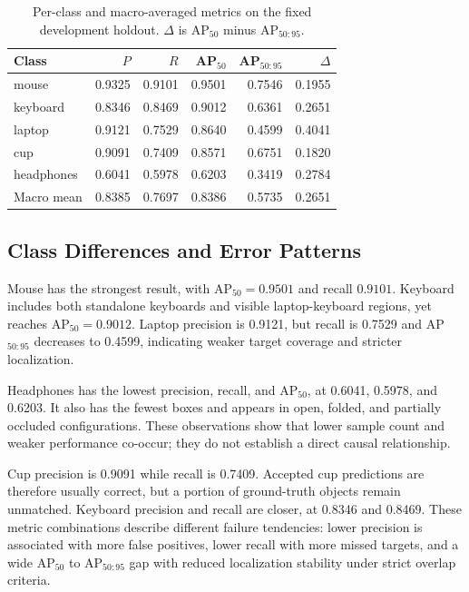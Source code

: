 \documentclass[12pt,a4paper]{article}
\begin{document}
\begin{table}[H]
\caption{Per-class and macro-averaged metrics on the fixed development holdout. $\Delta$ is AP$_{50}$ minus AP$_{50:95}$.}
\label{tab:metrics}
\centering
\small
\begin{tabular}{lrrrrr}
\toprule
Class & $P$ & $R$ & AP$_{50}$ & AP$_{50:95}$ & $\Delta$ \\
\midrule
mouse & 0.9325 & 0.9101 & 0.9501 & 0.7546 & 0.1955 \\
keyboard & 0.8346 & 0.8469 & 0.9012 & 0.6361 & 0.2651 \\
laptop & 0.9121 & 0.7529 & 0.8640 & 0.4599 & 0.4041 \\
cup & 0.9091 & 0.7409 & 0.8571 & 0.6751 & 0.1820 \\
headphones & 0.6041 & 0.5978 & 0.6203 & 0.3419 & 0.2784 \\
\midrule
Macro mean & 0.8385 & 0.7697 & 0.8386 & 0.5735 & 0.2651 \\
\bottomrule
\end{tabular}
\end{table}

\subsection{Class Differences and Error Patterns}

Mouse has the strongest result, with AP$_{50}=0.9501$ and recall $0.9101$. Keyboard includes both standalone keyboards and visible laptop-keyboard regions, yet reaches AP$_{50}=0.9012$. Laptop precision is 0.9121, but recall is 0.7529 and AP$_{50:95}$ decreases to 0.4599, indicating weaker target coverage and stricter localization.

Headphones has the lowest precision, recall, and AP$_{50}$, at 0.6041, 0.5978, and 0.6203. It also has the fewest boxes and appears in open, folded, and partially occluded configurations. These observations show that lower sample count and weaker performance co-occur; they do not establish a direct causal relationship.

Cup precision is 0.9091 while recall is 0.7409. Accepted cup predictions are therefore usually correct, but a portion of ground-truth objects remain unmatched. Keyboard precision and recall are closer, at 0.8346 and 0.8469. These metric combinations describe different failure tendencies: lower precision is associated with more false positives, lower recall with more missed targets, and a wide AP$_{50}$ to AP$_{50:95}$ gap with reduced localization stability under strict overlap criteria.
\end{document}
